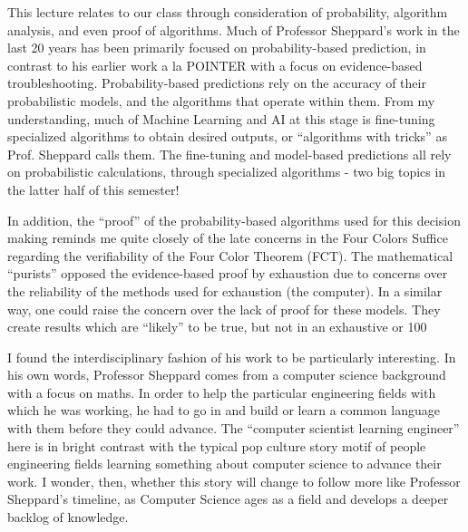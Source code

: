 \documentclass{article}
\begin{document}
This lecture relates to our class through consideration of probability, algorithm analysis, and even proof of algorithms. Much of Professor Sheppard’s work in the last 20 years has been primarily focused on probability-based prediction, in contrast to his earlier work a la POINTER with a focus on evidence-based troubleshooting. Probability-based predictions rely on the accuracy of their probabilistic models, and the algorithms that operate within them. From my understanding, much of Machine Learning and AI at this stage is fine-tuning specialized algorithms to obtain desired outputs, or “algorithms with tricks” as Prof. Sheppard calls them. The fine-tuning and model-based predictions all rely on probabilistic calculations, through specialized algorithms - two big topics in the latter half of this semester! 
\par In addition, the “proof” of the probability-based algorithms used for this decision making reminds me quite closely of the late concerns in the Four Colors Suffice regarding the verifiability of the Four Color Theorem (FCT). The mathematical “purists” opposed the evidence-based proof by exhaustion due to concerns over the reliability of the methods used for exhaustion (the computer). In a similar way, one could raise the concern over the lack of proof for these models. They create results which are “likely” to be true, but not in an exhaustive or 100%
\par I found the interdisciplinary fashion of his work to be particularly interesting. In his own words, Professor Sheppard comes from a computer science background with a focus on maths. In order to help the particular engineering fields with which he was working, he had to go in and build or learn a common language with them before they could advance. The “computer scientist learning engineer” here is in bright contrast with the typical pop culture story motif of people engineering fields learning something about computer science to advance their work. I wonder, then, whether this story will change to follow more like Professor Sheppard’s timeline, as Computer Science ages as a field and develops a deeper backlog of knowledge.
\end{document}
